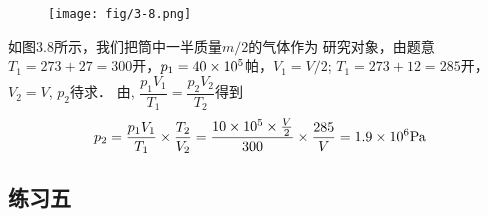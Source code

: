 \begin{enumerate}
\begin{figure}[htp]
    \centering
\texttt{[image: fig/3-8.png]}
    \caption{}
\end{figure}

\begin{solution}
如图3.8所示，我们把筒中一半质量$m/2$的气体作为
    研究对象，由题意$T_1=273+27=300$开，$p_1=40\times10^5$帕，$V_1=V/2$; $T_1=273+12=285$开，$V_2=V$, $p_2$待求．
    由, $\dfrac{p_1V_1}{T_1}=\dfrac{p_2V_2}{T_2}$得到
\[p_2=\frac{p_1V_1}{T_1}\times \frac{T_2}{V_2}=\frac{10\times 10^5\times \frac{V}{2}}{300}\times \frac{285}{V}=1.9\times 10^6{\rm Pa}\]
\end{solution}
\end{enumerate}

\subsection{练习五}

